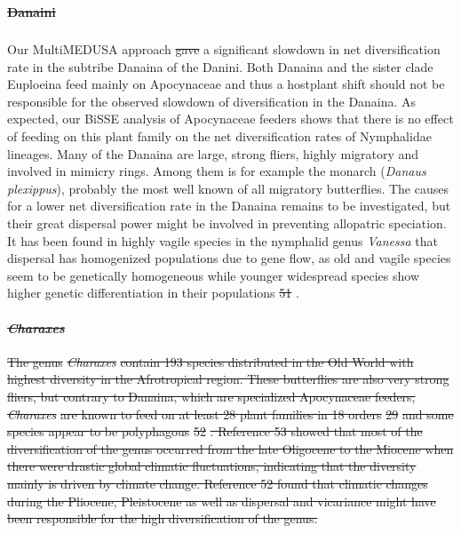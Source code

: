 \documentclass[10pt]{article}
\providecommand{\DIFaddtex}[1]{{\protect\color{blue}\uwave{#1}}} %
\providecommand{\DIFdeltex}[1]{{\protect\color{red}\sout{#1}}}                      %
\providecommand{\DIFaddbegin}{} %
\providecommand{\DIFaddend}{} %
\providecommand{\DIFdelbegin}{} %
\providecommand{\DIFdelend}{} %
\providecommand{\DIFadd}[1]{\texorpdfstring{\DIFaddtex{#1}}{#1}} %
\providecommand{\DIFdel}[1]{\texorpdfstring{\DIFdeltex{#1}}{}} %
\begin{document}
\paragraph{\DIFdel{Danaini}}
\addtocounter{paragraph}{-1}%

\DIFdelend \DIFaddbegin \subsubsection*{\DIFadd{Danaini}}
\DIFaddend Our MultiMEDUSA approach \DIFdelbegin \DIFdel{gave }\DIFdelend \DIFaddbegin \DIFadd{showed }\DIFaddend a significant slowdown in net
diversification rate in the subtribe Danaina of the Danini. Both Danaina
and the sister clade Euploeina feed mainly on Apocynaceae and thus a
hostplant shift should not be responsible for the observed slowdown of
diversification in the Danaina. As expected, our BiSSE analysis of
Apocynaceae feeders shows that there is no effect of feeding on this
plant family on the net diversification rates of Nymphalidae lineages.
Many of the Danaina are large, strong fliers, highly migratory and
involved in mimicry rings. Among them is for example the monarch
(\emph{Danaus plexippus}), probably the most well known of all migratory
butterflies. The causes for a lower net diversification rate in the
Danaina remains to be investigated, but their great dispersal power
might be involved in preventing allopatric speciation. It has been found
in highly vagile species in the nymphalid genus \emph{Vanessa} that
dispersal has homogenized populations due to gene flow, as old and
vagile species seem to be genetically homogeneous while younger
widespread species show higher genetic differentiation in their
populations \DIFdelbegin %
\DIFdel{51}%
\DIFdelend \DIFaddbegin \DIFadd{\mbox{%
\cite{wahlberg2011}
}%
}\DIFaddend .

\DIFdelbegin \paragraph{\emph{\DIFdel{Charaxes}}%
}
\addtocounter{paragraph}{-1}%

\DIFdel{The genus }\emph{\DIFdel{Charaxes}} %
\DIFdel{contain 193 species distributed in the Old
World with highest diversity in the Afrotropical region. These
butterflies are also very strong fliers, but contrary to Danaina, which
are specialized Apocynaceae feeders, }\emph{\DIFdel{Charaxes}} %
\DIFdel{are known to feed
on at least 28 plant families in 18 orders }%
\DIFdel{29}%
\DIFdel{and some species
appear to be polyphagous }%
\DIFdel{52}%
\DIFdel{. Reference 53 showed that most of the
diversification of the genus occurred from the late Oligocene to the
Miocene when there were drastic global climatic fluctuations, indicating
that the diversity mainly is driven by climate change. Reference 52
found that climatic changes during the Pliocene, Pleistocene as well as
dispersal and vicariance might have been responsible for the high
diversification of the genus.
}%
\end{document}
